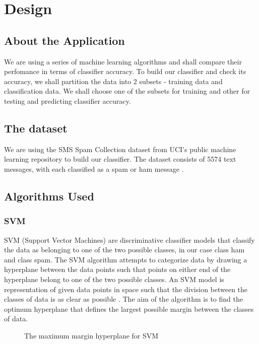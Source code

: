 \documentclass[9pt,twocolumn,twoside]{../../styles/osajnl}
\begin{document}
{\section{Design}

\subsection{About the Application}
We are using a series of machine learning algorithms and shall compare
their perfomance in terms of classifier accuracy. To build our
classifier and check its accuracy, we shall partition the data into 2
subsets - training data and classification data. We shall choose one
of the subsets for training and other for testing and predicting
classifier accuracy.

\subsection{The dataset}
We are using the SMS Spam Collection dataset from UCI's
public machine learning repository to build our classifier. The
dataset consists of 5574 text messages, with each classified as a spam
or ham message \cite{www-sms_spam_collection}.

\subsection{Algorithms Used}

\subsubsection{SVM}
SVM (Support Vector Machines) are discriminative classifier models
that classify the data as belonging to one of the two possible
classes, in our case class ham and class spam. The SVM algorithm
attempts to categorize data by drawing a hyperplane between the data
points such that points on either end of the hyperplane belong to one
of the two possible classes. An SVM model is representation of given
data points in space such that the division between the classes of
data is as clear as possible \cite{www-svm-wiki}. The aim of the algorithm
is to find the optimum hyperplane that defines the largest possible
margin between the classes of data.

\begin{figure}[htbp]
\centering
{}
\caption{The maximum margin hyperplane for SVM \cite{www-svm-tutorial}}
\label{fig:The maximum margin hyperplane for SVM}
\end{figure}

}
\end{document}
